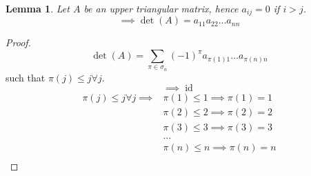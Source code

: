 \documentclass{article}
\newtheorem{lemma}{Lemma}  \numberwithin{lemma}{section}
\begin{document}
\begin{lemma} %
  Let $A$ be an upper triangular matrix, hence $a_{ij} = 0$ if $i > j$.
  \[ \implies \det(A) = a_{11} a_{22} \dots a_{nn} \]
\end{lemma}
\begin{proof}
  \[ \det(A) = \sum_{\pi \in \sigma_n} (-1)^\pi a_{\pi(1) 1} \dots a_{\pi(n) n} \]
  such that $\pi(j) \leq j \forall j$.
  \[ \implies \operatorname{id} \]
  \begin{align*}
    \pi(j) \leq j \forall j \implies
      &\pi(1) \leq 1 \implies \pi(1) = 1 \\
      &\pi(2) \leq 2 \implies \pi(2) = 2 \\
      &\pi(3) \leq 3 \implies \pi(3) = 3 \\
      &\dots \\
      &\pi(n) \leq n \implies \pi(n) = n \\
  \end{align*}
\end{proof}
\end{document}
